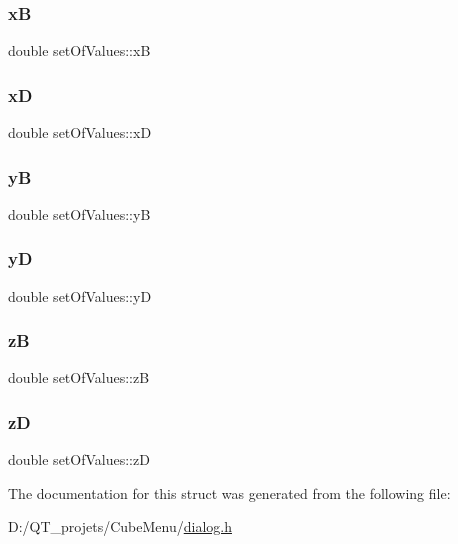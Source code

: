 \subsubsection{\texorpdfstring{xB}{xB}}
{\footnotesize\ttfamily double set\+Of\+Values\+::xB}

\hypertarget{structset_of_values_ab937d8ca1493a6b7fcb4ec13a6507dd1}{}\label{structset_of_values_ab937d8ca1493a6b7fcb4ec13a6507dd1} 
\subsubsection{\texorpdfstring{xD}{xD}}
{\footnotesize\ttfamily double set\+Of\+Values\+::xD}

\hypertarget{structset_of_values_a64756693023b45c80cbb542fd2f834e3}{}\label{structset_of_values_a64756693023b45c80cbb542fd2f834e3} 
\subsubsection{\texorpdfstring{yB}{yB}}
{\footnotesize\ttfamily double set\+Of\+Values\+::yB}

\hypertarget{structset_of_values_a229a82279aeb68d2b63c3ca81d12a4db}{}\label{structset_of_values_a229a82279aeb68d2b63c3ca81d12a4db} 
\subsubsection{\texorpdfstring{yD}{yD}}
{\footnotesize\ttfamily double set\+Of\+Values\+::yD}

\hypertarget{structset_of_values_a00e8dca4650208fa2d9a7c8cce72bae2}{}\label{structset_of_values_a00e8dca4650208fa2d9a7c8cce72bae2} 
\subsubsection{\texorpdfstring{zB}{zB}}
{\footnotesize\ttfamily double set\+Of\+Values\+::zB}

\hypertarget{structset_of_values_ae75c3668aeac869d48699ce68ab58375}{}\label{structset_of_values_ae75c3668aeac869d48699ce68ab58375} 
\subsubsection{\texorpdfstring{zD}{zD}}
{\footnotesize\ttfamily double set\+Of\+Values\+::zD}



The documentation for this struct was generated from the following file\+:\begin{DoxyCompactItemize}
\item 
D\+:/\+Q\+T\+\_\+projets/\+Cube\+Menu/\hyperlink{dialog_8h}{dialog.\+h}\end{DoxyCompactItemize}
